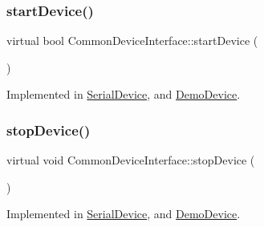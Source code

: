 \hypertarget{class_common_device_interface_aa25434f588f2b8e4daa77f57f595d161}{}\label{class_common_device_interface_aa25434f588f2b8e4daa77f57f595d161} 
\subsubsection{\texorpdfstring{start\+Device()}{startDevice()}}
{\footnotesize\ttfamily virtual bool Common\+Device\+Interface\+::start\+Device (\begin{DoxyParamCaption}{ }\end{DoxyParamCaption})\hspace{0.3cm}{\ttfamily [pure virtual]}}



Implemented in \hyperlink{class_serial_device_a6940a33b7c8f4b83438d16cfa7d8d3ff}{Serial\+Device}, and \hyperlink{class_demo_device_af350ecf6ff289983cff9053197f1b1f2}{Demo\+Device}.

\hypertarget{class_common_device_interface_a53aaf8eee7297f3ee272cc4f366506bf}{}\label{class_common_device_interface_a53aaf8eee7297f3ee272cc4f366506bf} 
\subsubsection{\texorpdfstring{stop\+Device()}{stopDevice()}}
{\footnotesize\ttfamily virtual void Common\+Device\+Interface\+::stop\+Device (\begin{DoxyParamCaption}{ }\end{DoxyParamCaption})\hspace{0.3cm}{\ttfamily [pure virtual]}}



Implemented in \hyperlink{class_serial_device_a55f94898f33ab4674c138fa2cb2e75a1}{Serial\+Device}, and \hyperlink{class_demo_device_ab95434f7121f00789108f29a8457ec98}{Demo\+Device}.

\hypertarget{class_common_device_interface_ac0166ca78cba5ae57a4803978af9e78c}{}\label{class_common_device_interface_ac0166ca78cba5ae57a4803978af9e78c} 
